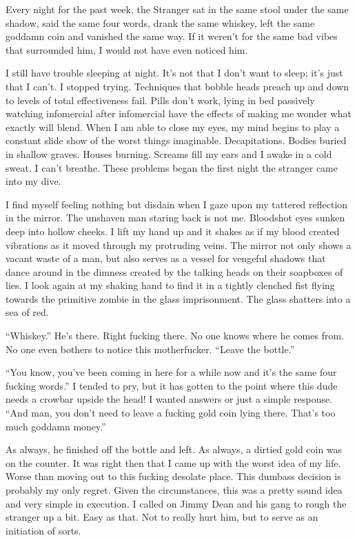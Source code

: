 Every night for the past week, the Stranger sat in the same stool
under the same shadow, said the same four words, drank the same
whiskey, left the same goddamn coin and vanished the same way. If
it weren't for the same bad vibes that surrounded him, I
would not have even noticed him.



I still have trouble sleeping at night. It's not that I
don't want to sleep; it's just that I can't. I
stopped trying. Techniques that bobble heads preach up and down to
levels of total effectiveness fail. Pills don't work, lying
in bed passively watching infomercial after infomercial have the
effects of making me wonder what exactly will blend. When I am able
to close my eyes, my mind begins to play a constant slide show of
the worst things imaginable. Decapitations. Bodies buried in
shallow graves. Houses burning. Screams fill my ears and I awake in
a cold sweat. I can't breathe. These problems began the first
night the stranger came into my dive.



I find myself feeling nothing but disdain when I gaze upon my
tattered reflection in the mirror. The unshaven man staring back is
not me. Bloodshot eyes sunken deep into hollow cheeks. I lift my
hand up and it shakes as if my blood created vibrations as it moved
through my protruding veins. The mirror not only shows a vacant
waste of a man, but also serves as a vessel for vengeful shadows
that dance around in the dimness created by the talking heads on
their soapboxes of lies. I look again at my shaking hand to find it
in a tightly clenched fist flying towards the primitive zombie in
the glass imprisonment. The glass shatters into a sea of red.



``Whiskey.'' He's there. Right fucking there. No
one knows where he comes from. No one even bothers to notice this
motherfucker. ``Leave the bottle.''



``You know, you've been coming in here for a while now
and it's the same four fucking words.'' I tended to pry,
but it has gotten to the point where this dude needs a crowbar
upside the head! I wanted answers or just a simple response.
``And man, you don't need to leave a fucking gold coin
lying there. That's too much goddamn money.''



As always, he finished off the bottle and left. As always, a
dirtied gold coin was on the counter. It was right then that I came
up with the worst idea of my life. Worse than moving out to this
fucking desolate place. This dumbass decision is probably my only
regret. Given the circumstances, this was a pretty sound idea and
very simple in execution. I called on Jimmy Dean and his gang to
rough the stranger up a bit. Easy as that. Not to really hurt him,
but to serve as an initiation of sorts.



